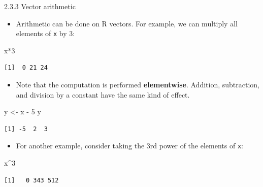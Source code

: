 \documentclass[
  9pt,
  a4paper,
  ignorenonframetext,
  notheorems]{beamer}
\newenvironment{Shaded}{\begin{snugshade}}{\end{snugshade}}
\newcommand{\DecValTok}[1]{\textcolor[rgb]{0.68,0.00,0.00}{#1}}
\newcommand{\NormalTok}[1]{\textcolor[rgb]{0.00,0.23,0.31}{#1}}
\newcommand{\OtherTok}[1]{\textcolor[rgb]{0.00,0.23,0.31}{#1}}
\newcommand{\SpecialCharTok}[1]{\textcolor[rgb]{0.37,0.37,0.37}{#1}}
\providecommand{\tightlist}{%
  \setlength{\itemsep}{0pt}\setlength{\parskip}{0pt}}\usepackage{longtable,booktabs,array}
\begin{document}
\begin{frame}[fragile]{2.3.3 Vector arithmetic}
\protect\hypertarget{vector-arithmetic}{}
\begin{itemize}
\tightlist
\item
  Arithmetic can be done on R vectors. For example, we can multiply all
  elements of \texttt{x} by 3:
\end{itemize}

\begin{Shaded}
\begin{Highlighting}[]
\NormalTok{x}\SpecialCharTok{*}\DecValTok{3}
\end{Highlighting}
\end{Shaded}

\begin{verbatim}
[1]  0 21 24
\end{verbatim}

\begin{itemize}
\tightlist
\item
  Note that the computation is performed \textbf{elementwise}. Addition,
  subtraction, and division by a constant have the same kind of effect.
\end{itemize}

\begin{Shaded}
\begin{Highlighting}[]
\NormalTok{y }\OtherTok{\textless{}{-}}\NormalTok{ x }\SpecialCharTok{{-}} \DecValTok{5}
\NormalTok{y}
\end{Highlighting}
\end{Shaded}

\begin{verbatim}
[1] -5  2  3
\end{verbatim}

\begin{itemize}
\tightlist
\item
  For another example, consider taking the 3rd power of the elements of
  \texttt{x}:
\end{itemize}

\begin{Shaded}
\begin{Highlighting}[]
\NormalTok{x}\SpecialCharTok{\^{}}\DecValTok{3}
\end{Highlighting}
\end{Shaded}

\begin{verbatim}
[1]   0 343 512
\end{verbatim}
\end{frame}
\end{document}
